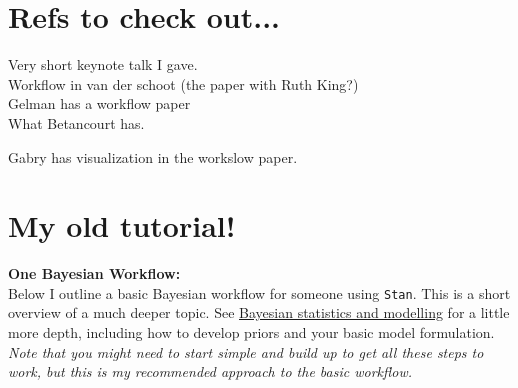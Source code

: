\documentclass[11pt]{article}
\begin{document}
\section{Refs to check out...}

Very short keynote talk I gave. \\ %

Workflow in van der schoot (the paper with Ruth King?)\\
Gelman has a workflow paper \\

What Betancourt has.

Gabry has visualization in the workslow paper. 

\newpage
\section{My old tutorial!} %

{\bf One Bayesian Workflow:} \\

Below I outline a basic Bayesian workflow for someone using \verb|Stan|. This is a short overview of a much deeper topic. See \href{https://www.nature.com/articles/s43586-020-00001-2}{Bayesian statistics and modelling} for a little more depth, including how to develop priors and your basic model formulation.\\

\emph{Note that you might need to start simple and build up to get all these steps to work, but this is my recommended approach to the basic workflow.}
\end{document}
